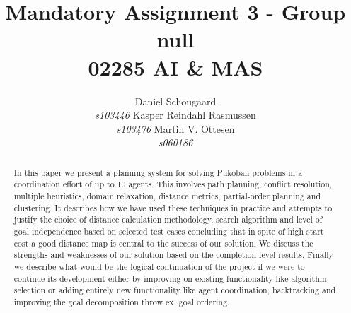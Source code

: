 \documentclass[letterpaper]{article}
\begin{document}
\title{Mandatory Assignment 3 - Group null\\ 02285 AI \& MAS}
\author{Daniel Schougaard \\ \textit{s103446} \And Kasper Reindahl Rasmussen\\ \textit{s103476} \And Martin V. Ottesen\\ \textit{s060186}}
\maketitle

\begin{abstract}
In this paper we present a planning system for solving Pukoban problems in a coordination effort of up to 10 agents. This involves path planning, conflict resolution, multiple heuristics, domain relaxation, distance metrics, partial-order planning and clustering.  It describes how we have used these techniques in practice and attempts to justify the choice of distance calculation methodology, search algorithm and level of goal independence based on selected test cases concluding that in spite of high start cost a good distance map is central to the success of our solution.  We discuss the strengths and weaknesses of our solution based on the completion level results. Finally we describe what would be the logical continuation of the project if we were to continue its development either by improving on existing functionality like algorithm selection or adding entirely new functionality like agent coordination, backtracking and improving the goal decomposition throw ex. goal ordering.
\end{abstract}
\end{document}
